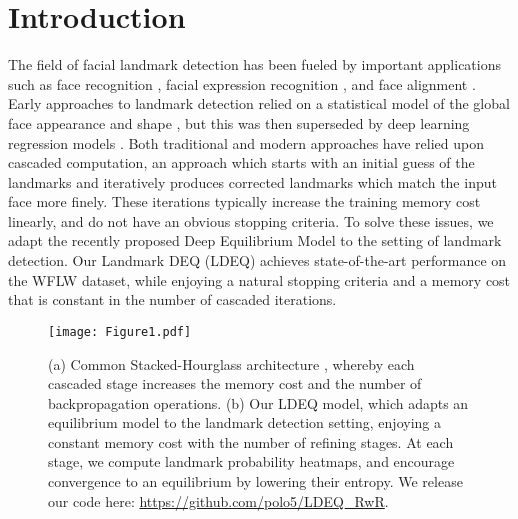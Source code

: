 \documentclass[10pt,twocolumn,letterpaper]{article}
\begin{document}
\section{Introduction}
\label{sec:intro}

The field of facial landmark detection has been fueled by important applications such as face recognition \cite{Masi2018DeepFaceRecognitionSurvey1, Wang2018DeepFaceRecognitionSurvey2}, facial expression recognition \cite{Shan2021DeepFacialExpressionRecognitionSurvey, Jung2015FaceExpressionLandmarkTrajectory, Kim2017MultiModalEmotionRecognition, Yan2016MultiClueFusion, Hasani2017EnhancedDeep3DCNNs}, and face alignment \cite{Xiangyu2015HighFidelityPoseNormalization, Mallikarjun2015EfficientFaceFrontalization, Zhang2013PoseInvariantRecognition}. Early approaches to landmark detection relied on a statistical model of the global face appearance and shape \cite{Edwards1998InterpretingFaceImagesWithAAM, Cootes2011AAM, Cristinacce2006ConstrainedLocalModels}, but this was then superseded by deep learning regression models \cite{Wayne2018LookAtBoundary, Feng2018WingLoss, Wan2020MultiOrderHG, Valle2018EnsembleOfRegressionTrees, Dapogny2019DeCaFA, Sun2019HRNet, Qian2019AggregationViaSeparation, Kumar2020Luvli, Wang2019AdaptiveWingLoss, Lin2021StructureCoherent,  Li2020StructuredLandmarkDetection, Huang2021ADNet, Xia2022SLPT}. Both traditional and modern approaches have relied upon cascaded computation, an approach which starts with an initial guess of the landmarks and iteratively produces corrected landmarks which match the input face more finely. These iterations typically increase the training memory cost linearly, and do not have an obvious stopping criteria. To solve these issues, we adapt the recently proposed Deep Equilibrium Model \cite{Bai2019DEQs, Bai2020MDEQs, Bai2021DEQJacobianRegularization} to the setting of landmark detection. Our Landmark DEQ (LDEQ) achieves state-of-the-art performance on the WFLW dataset, while enjoying a natural stopping criteria and a memory cost that is constant in the number of cascaded iterations. 

\begin{figure*}[t!]
  \centering
   \texttt{[image: Figure1.pdf]}
   \caption{(a) Common Stacked-Hourglass architecture \cite{Newell2016StackedHourglass}, whereby each cascaded stage increases the memory cost and the number of backpropagation operations. (b) Our LDEQ model, which adapts an equilibrium model \cite{Bai2019DEQs} to the landmark detection setting, enjoying a constant memory cost with the number of refining stages. At each stage, we compute landmark probability heatmaps, and encourage convergence to an equilibrium by lowering their entropy. We release our code here: {\url{https://github.com/polo5/LDEQ_RwR}}.} 
   \label{fig:deq vs stacked hourglass}
\end{figure*}
\end{document}
